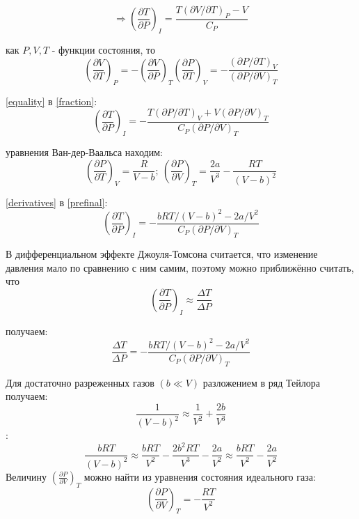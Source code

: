 \documentclass[15pt,a5paper,reqno]{article}
\begin{document}
    \begin{equation}\label{fraction}
        \Rightarrow \left(\frac{\partial T}{\partial P}\right)_I = \frac{T(\partial V / \partial T)_P - V}{C_P}
    \end{equation}
    
     как $P, V, T$ - функции состояния, то
    \begin{equation}\label{equality}
        \left(\frac{\partial V}{\partial T}\right)_P = -\left(\frac{\partial V}{\partial P}\right)_T \left(\frac{\partial P}{\partial T}\right)_V =
        -\frac{(\partial P/\partial T)_V}{(\partial P/\partial V)_T}
    \end{equation}
    
     \eqref{equality} в \eqref{fraction}:
    \begin{equation}\label{prefinal}
        \left(\frac{\partial T}{\partial P}\right)_I = -\frac{T(\partial P / \partial T)_V + V(\partial P /\partial V)_T}{C_P(\partial P /\partial V)_T}
    \end{equation}
    
     уравнения Ван-дер-Ваальса находим:
    \begin{equation}\label{derivatives}
        \left(\frac{\partial P}{\partial T}\right)_V = \frac{R}{V - b};\ \left(\frac{\partial P}{\partial V}\right)_T = \frac{2a}{V^3} - \frac{RT}{(V - b)^2}
    \end{equation}
    
     \eqref{derivatives} в \eqref{prefinal}:
    \begin{equation}
        \left(\frac{\partial T}{\partial P}\right)_I = -\frac{bRT / (V - b)^2 - 2a / V^2}{C_P(\partial P /\partial V)_T}
    \end{equation}
    
    В дифференциальном эффекте Джоуля-Томсона считается, что изменение давления мало по сравнению с ним самим, поэтому можно приближённо считать, что
    \[\left(\frac{\partial T}{\partial P}\right)_I \approx \frac{\Delta T}{\Delta P}\]
    
     получаем:
    \[\boxed{\frac{\Delta T}{\Delta P} = -\frac{bRT / (V - b)^2 - 2a / V^2}{C_P(\partial P /\partial V)_T}}\]
    
    Для достаточно разреженных газов $(b \ll V)$ разложением в ряд Тейлора получаем: \[\frac{1}{(V-b)^2}\approx\frac{1}{V^2} + \frac{2b}{V^3}\]
    :
    \[\frac{bRT}{(V - b)^2} \approx \frac{bRT}{V^2} - \frac{2b^2RT}{V^3}-\frac{2a}{V^2} \approx  \frac{bRT}{V^2} - \frac{2a}{V^2}\]
    Величину $\left(\frac{\partial P}{\partial V}\right)_T$ можно найти из уравнения состояния идеального газа:
    \[\left(\frac{\partial P}{\partial V}\right)_T = -\frac{RT}{V^2}\]
    
\end{document}
